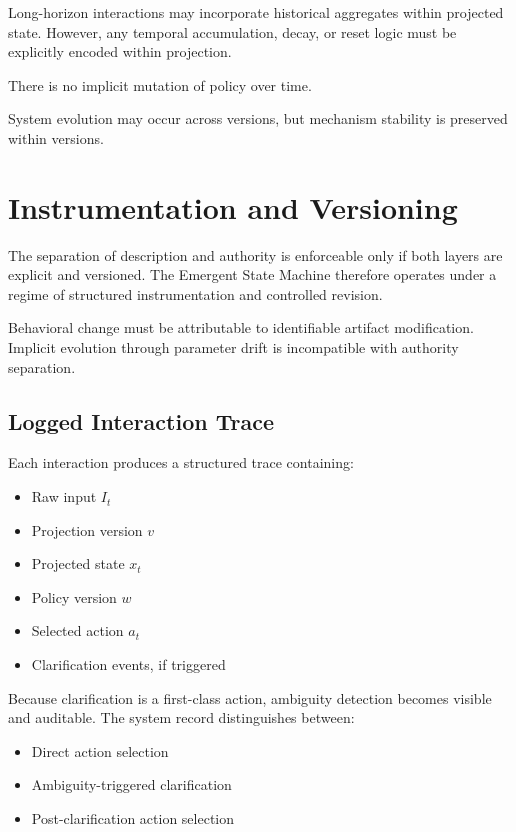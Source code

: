 \documentclass[11pt]{article}
\begin{document}
Long-horizon interactions may incorporate historical aggregates within projected state. However, any temporal accumulation, decay, or reset logic must be explicitly encoded within projection.

There is no implicit mutation of policy over time.

System evolution may occur across versions, but mechanism stability is preserved within versions.




\section{Instrumentation and Versioning}

The separation of description and authority is enforceable only if both layers are explicit and versioned. The Emergent State Machine therefore operates under a regime of structured instrumentation and controlled revision.

Behavioral change must be attributable to identifiable artifact modification. Implicit evolution through parameter drift is incompatible with authority separation.

\subsection{Logged Interaction Trace}

Each interaction produces a structured trace containing:

\begin{itemize}
  \item Raw input $I_t$
  \item Projection version $v$
  \item Projected state $x_t$
  \item Policy version $w$
  \item Selected action $a_t$
  \item Clarification events, if triggered
\end{itemize}

Because clarification is a first-class action, ambiguity detection becomes visible and auditable. The system record distinguishes between:

\begin{itemize}
  \item Direct action selection
  \item Ambiguity-triggered clarification
  \item Post-clarification action selection
\end{itemize}
\end{document}
